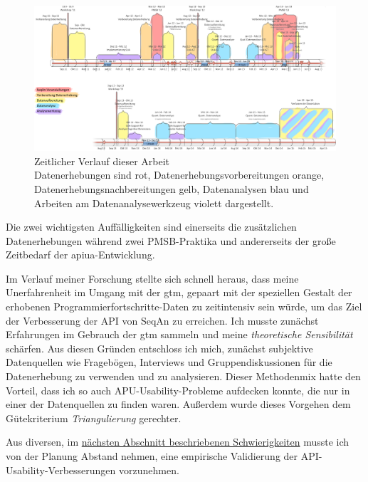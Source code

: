 \thispagestyle{empty}
\begin{landscape}
\begin{figure}
  \centering
    \includegraphics[width=1.0\linewidth]{Figures/forschung-ablauf.png}
  \caption[Zeitlicher Verlauf dieser Arbeit]{Zeitlicher Verlauf dieser Arbeit\\Datenerhebungen sind rot, Datenerhebungsvorbereitungen orange, Datenerhebungsnachbereitungen gelb, Datenanalysen blau und Arbeiten am Datenanalysewerkzeug violett dargestellt.}
  \label{fig:forschung-ablauf}
\end{figure}
\end{landscape}
\restoregeometry

Die zwei wichtigsten Auffälligkeiten sind einerseits die zusätzlichen Datenerhebungen während zwei PMSB-Praktika und andererseits der große Zeitbedarf der \gls{apiua}-Entwicklung.

Im Verlauf meiner Forschung stellte sich schnell heraus, dass meine Unerfahrenheit im Umgang mit der \gls{gtm}, gepaart mit der speziellen Gestalt der erhobenen Programmierfortschritte-Daten zu zeitintensiv sein würde, um das Ziel der Verbesserung der API von SeqAn zu erreichen. Ich musste zunächst Erfahrungen im Gebrauch der \gls{gtm} sammeln und meine \textit{theoretische Sensibilität} schärfen. Aus diesen Gründen entschloss ich mich, zunächst subjektive Datenquellen wie Fragebögen, Interviews und Gruppendiskussionen für die Datenerhebung zu verwenden und zu analysieren. Dieser Methodenmix hatte den Vorteil, dass ich so auch APU-Usability-Probleme aufdecken konnte, die nur in einer der Datenquellen zu finden waren. Außerdem wurde dieses Vorgehen dem Gütekriterium \textit{Triangulierung} \citep{mayring2002einfhrung} gerechter.

Aus diversen, im \href{sec:schwierigkeiten}{nächsten Abschnitt beschriebenen Schwierigkeiten} musste ich von der Planung Abstand nehmen, eine empirische Validierung der API-Usability-Verbesserungen vorzunehmen.



